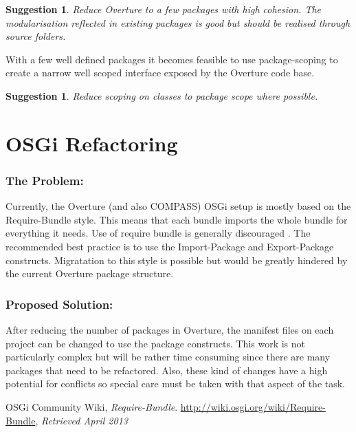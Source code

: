 \documentclass[11pt]{overturerep} \usepackage{t1enc,times,a4,t1enc}
\newtheorem{sug}[subsection]{Suggestion}
\begin{document}
\begin{sug} Reduce Overture to a few packages with high cohesion. The
modularisation reflected in existing packages is good but should be realised
through source folders.  \end{sug}

With a few well defined packages it becomes feasible to use package-scoping to
create a narrow well scoped interface exposed by the Overture code base.

\begin{sug} Reduce scoping on classes to package scope where possible.
\end{sug}




\section{OSGi Refactoring} \label{sec:osgi} 

    \subsubsection{The Problem:} Currently, the Overture (and also COMPASS)
    OSGi setup is mostly based on the \textsf{Require-Bundle} style. This means
    that each bundle imports the whole bundle for everything it needs. Use of
    require bundle is generally discouraged \cite{osgi2013}. The recommended
    best practice is to use the \textsf{Import-Package} and
    \textsf{Export-Package} constructs. Migratation to this style is possible
    but would be greatly hindered by the current Overture package structure.


    \subsubsection{Proposed Solution:} After reducing the number of packages in
    Overture, the manifest files on each project can be changed to use the
    package constructs. This work is not particularly complex but will be
    rather time consuming since there are many packages that need to be
    refactored. Also, these kind of changes have a high potential for conflicts
    so special care must be taken with that aspect of the task.




    \begin{thebibliography}{9}

 OSGi Community Wiki, \emph{Require-Bundle}.
    \url{http://wiki.osgi.org/wiki/Require-Bundle}, \emph{Retrieved April 2013}

\end{thebibliography} 
\end{document}
